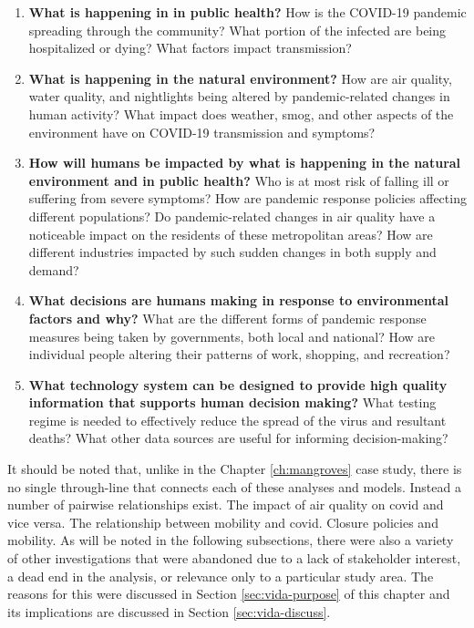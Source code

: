 \begin{enumerate}[itemsep=0pt,parsep=0pt]
	\item \textbf{What is happening in in public health?} How is the COVID-19 pandemic spreading through the community? What portion of the infected are being hospitalized or dying? What factors impact transmission?
	\item \textbf{What is happening in the natural environment?} How are air quality, water quality, and nightlights being altered by pandemic-related changes in human activity? What impact does weather, smog, and other aspects of the environment have on COVID-19 transmission and symptoms?
	\item \textbf{How will humans be impacted by what is happening in the natural environment and in public health?} Who is at most risk of falling ill or suffering from severe symptoms? How are pandemic response policies affecting different populations? Do pandemic-related changes in air quality have a noticeable impact on the residents of these metropolitan areas? How are different industries impacted by such sudden changes in both supply and demand?
	\item \textbf{What decisions are humans making in response to environmental factors and why?} What are the different forms of pandemic response measures being taken by governments, both local and national? How are individual people altering their patterns of work, shopping, and recreation?  
	\item \textbf{What technology system can be designed to provide high quality information that supports human decision making?} What testing regime is needed to effectively reduce the spread of the virus and resultant deaths? What other data sources are useful for informing decision-making?
\end{enumerate}

It should be noted that, unlike in the Chapter \ref{ch:mangroves} case study, there is no single through-line that connects each of these analyses and models. Instead a number of pairwise relationships exist. The impact of air quality on \ac{covid} and vice versa. The relationship between mobility and \ac{covid}. Closure policies and mobility. As will be noted in the following subsections, there were also a variety of other investigations that were abandoned due to a lack of stakeholder interest, a dead end in the analysis, or relevance only to a particular study area. The reasons for this were discussed in Section \ref{sec:vida-purpose} of this chapter and its implications are discussed in Section \ref{sec:vida-discuss}.

